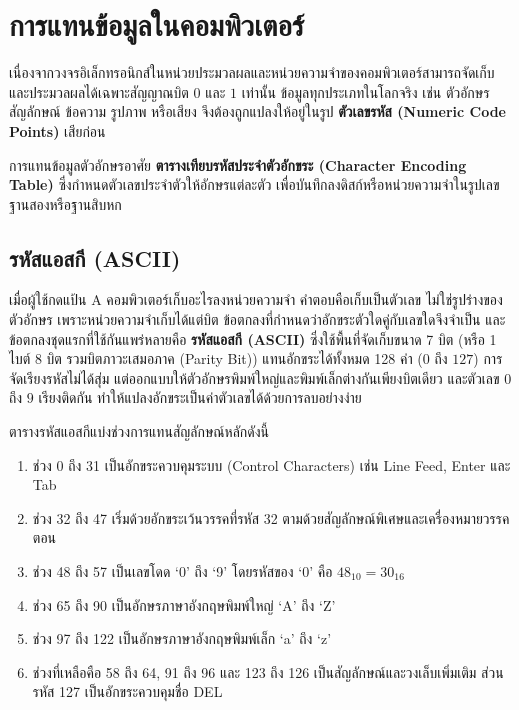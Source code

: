 \section{การแทนข้อมูลในคอมพิวเตอร์}
\label{sec:data-representation}

เนื่องจากวงจรอิเล็กทรอนิกส์ในหน่วยประมวลผลและหน่วยความจำของคอมพิวเตอร์สามารถจัดเก็บและประมวลผลได้เฉพาะสัญญาณบิต $0$ และ $1$ เท่านั้น ข้อมูลทุกประเภทในโลกจริง เช่น ตัวอักษร สัญลักษณ์ ข้อความ รูปภาพ หรือเสียง จึงต้องถูกแปลงให้อยู่ในรูป \textbf{ตัวเลขรหัส (Numeric Code Points)} เสียก่อน~\parencite{kolman2008discrete}

การแทนข้อมูลตัวอักษรอาศัย \textbf{ตารางเทียบรหัสประจำตัวอักขระ (Character Encoding Table)} ซึ่งกำหนดตัวเลขประจำตัวให้อักษรแต่ละตัว เพื่อบันทึกลงดิสก์หรือหน่วยความจำในรูปเลขฐานสองหรือฐานสิบหก

\subsection{รหัสแอสกี (ASCII)}
\label{ssec:ascii-representation}
เมื่อผู้ใช้กดแป้น A คอมพิวเตอร์เก็บอะไรลงหน่วยความจำ คำตอบคือเก็บเป็นตัวเลข ไม่ใช่รูปร่างของตัวอักษร เพราะหน่วยความจำเก็บได้แต่บิต ข้อตกลงที่กำหนดว่าอักขระตัวใดคู่กับเลขใดจึงจำเป็น และข้อตกลงชุดแรกที่ใช้กันแพร่หลายคือ \textbf{รหัสแอสกี (ASCII)} ซึ่งใช้พื้นที่จัดเก็บขนาด 7 บิต (หรือ 1 ไบต์ 8 บิต รวมบิตภาวะเสมอภาค (Parity Bit)) แทนอักขระได้ทั้งหมด 128 ค่า ($0$ ถึง $127$) การจัดเรียงรหัสไม่ได้สุ่ม แต่ออกแบบให้ตัวอักษรพิมพ์ใหญ่และพิมพ์เล็กต่างกันเพียงบิตเดียว และตัวเลข $0$ ถึง $9$ เรียงติดกัน ทำให้แปลงอักขระเป็นค่าตัวเลขได้ด้วยการลบอย่างง่าย~\parencite{mano2018digital}

\begin{principle}
\label{principle:ascii-ranges}
ตารางรหัสแอสกีแบ่งช่วงการแทนสัญลักษณ์หลักดังนี้
\begin{enumerate}
    \item ช่วง 0 ถึง 31 เป็นอักขระควบคุมระบบ (Control Characters) เช่น Line Feed, Enter และ Tab
    \item ช่วง 32 ถึง 47 เริ่มด้วยอักขระเว้นวรรคที่รหัส 32 ตามด้วยสัญลักษณ์พิเศษและเครื่องหมายวรรคตอน
    \item ช่วง 48 ถึง 57 เป็นเลขโดด `0' ถึง `9' โดยรหัสของ `0' คือ $48_{10} = 30_{16}$
    \item ช่วง 65 ถึง 90 เป็นอักษรภาษาอังกฤษพิมพ์ใหญ่ `A' ถึง `Z'
    \item ช่วง 97 ถึง 122 เป็นอักษรภาษาอังกฤษพิมพ์เล็ก `a' ถึง `z'
    \item ช่วงที่เหลือคือ 58 ถึง 64, 91 ถึง 96 และ 123 ถึง 126 เป็นสัญลักษณ์และวงเล็บเพิ่มเติม ส่วนรหัส 127 เป็นอักขระควบคุมชื่อ DEL
\end{enumerate}
\end{principle}

